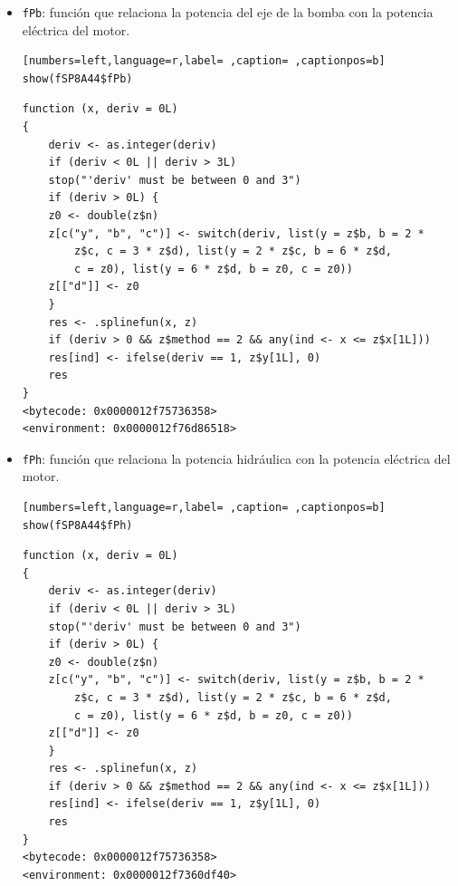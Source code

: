 \begin{itemize}
\begin{itemize}
\begin{verbatim}
function (x, deriv = 0L) 
{
    deriv <- as.integer(deriv)
    if (deriv < 0L || deriv > 3L) 
	stop("'deriv' must be between 0 and 3")
    if (deriv > 0L) {
	z0 <- double(z$n)
	z[c("y", "b", "c")] <- switch(deriv, list(y = z$b, b = 2 * 
	    z$c, c = 3 * z$d), list(y = 2 * z$c, b = 6 * z$d, 
	    c = z0), list(y = 6 * z$d, b = z0, c = z0))
	z[["d"]] <- z0
    }
    res <- .splinefun(x, z)
    if (deriv > 0 && z$method == 2 && any(ind <- x <= z$x[1L])) 
	res[ind] <- ifelse(deriv == 1, z$y[1L], 0)
    res
}
<bytecode: 0x0000012f75736358>
<environment: 0x0000012f7674c350>
\end{verbatim}

\item \texttt{fPb}: función que relaciona la potencia del eje de la bomba con la potencia eléctrica del motor.
\begin{lstlisting}[numbers=left,language=r,label= ,caption= ,captionpos=b]
show(fSP8A44$fPb)
\end{lstlisting}

\begin{verbatim}
function (x, deriv = 0L) 
{
    deriv <- as.integer(deriv)
    if (deriv < 0L || deriv > 3L) 
	stop("'deriv' must be between 0 and 3")
    if (deriv > 0L) {
	z0 <- double(z$n)
	z[c("y", "b", "c")] <- switch(deriv, list(y = z$b, b = 2 * 
	    z$c, c = 3 * z$d), list(y = 2 * z$c, b = 6 * z$d, 
	    c = z0), list(y = 6 * z$d, b = z0, c = z0))
	z[["d"]] <- z0
    }
    res <- .splinefun(x, z)
    if (deriv > 0 && z$method == 2 && any(ind <- x <= z$x[1L])) 
	res[ind] <- ifelse(deriv == 1, z$y[1L], 0)
    res
}
<bytecode: 0x0000012f75736358>
<environment: 0x0000012f76d86518>
\end{verbatim}

\item \texttt{fPh}: función que relaciona la potencia hidráulica con la potencia eléctrica del motor.
\begin{lstlisting}[numbers=left,language=r,label= ,caption= ,captionpos=b]
show(fSP8A44$fPh)
\end{lstlisting}

\begin{verbatim}
function (x, deriv = 0L) 
{
    deriv <- as.integer(deriv)
    if (deriv < 0L || deriv > 3L) 
	stop("'deriv' must be between 0 and 3")
    if (deriv > 0L) {
	z0 <- double(z$n)
	z[c("y", "b", "c")] <- switch(deriv, list(y = z$b, b = 2 * 
	    z$c, c = 3 * z$d), list(y = 2 * z$c, b = 6 * z$d, 
	    c = z0), list(y = 6 * z$d, b = z0, c = z0))
	z[["d"]] <- z0
    }
    res <- .splinefun(x, z)
    if (deriv > 0 && z$method == 2 && any(ind <- x <= z$x[1L])) 
	res[ind] <- ifelse(deriv == 1, z$y[1L], 0)
    res
}
<bytecode: 0x0000012f75736358>
<environment: 0x0000012f7360df40>
\end{verbatim}


\end{itemize}
\end{itemize}
